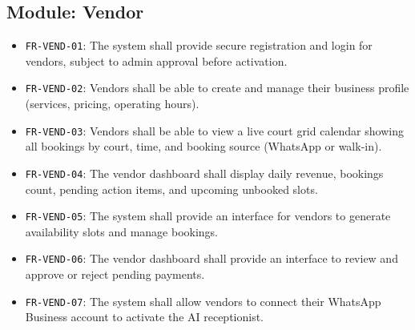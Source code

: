 \subsection{Module: Vendor}
\begin{itemize}
  \item \texttt{FR-VEND-01}: The system shall provide secure registration and login for vendors, subject to admin approval before activation.
  \item \texttt{FR-VEND-02}: Vendors shall be able to create and manage their business profile (services, pricing, operating hours).
  \item \texttt{FR-VEND-03}: Vendors shall be able to view a live court grid calendar showing all bookings by court, time, and booking source (WhatsApp or walk-in).
  \item \texttt{FR-VEND-04}: The vendor dashboard shall display daily revenue, bookings count, pending action items, and upcoming unbooked slots.
  \item \texttt{FR-VEND-05}: The system shall provide an interface for vendors to generate availability slots and manage bookings.
  \item \texttt{FR-VEND-06}: The vendor dashboard shall provide an interface to review and approve or reject pending payments.
  \item \texttt{FR-VEND-07}: The system shall allow vendors to connect their WhatsApp Business account to activate the AI receptionist.
\end{itemize}

